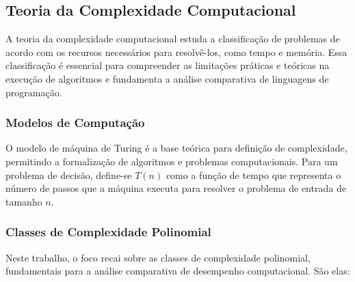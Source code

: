 \documentclass[12pt, a4paper]{article}
\begin{document}
\subsection{Teoria da Complexidade Computacional}

A teoria da complexidade computacional estuda a classificação de problemas de acordo com os recursos necessários para resolvê-los, como tempo e memória. Essa classificação é essencial para compreender as limitações práticas e teóricas na execução de algoritmos e fundamenta a análise comparativa de linguagens de programação.  

\subsubsection{Modelos de Computação}

O modelo de máquina de Turing é a base teórica para definição de complexidade, permitindo a formalização de algoritmos e problemas computacionais. Para um problema de decisão, define-se \( T(n) \) como a função de tempo que representa o número de passos que a máquina executa para resolver o problema de entrada de tamanho \( n \).

\subsubsection{Classes de Complexidade Polinomial}

Neste trabalho, o foco recai sobre as classes de complexidade polinomial, fundamentais para a análise comparativa de desempenho computacional. São elas:
\end{document}
